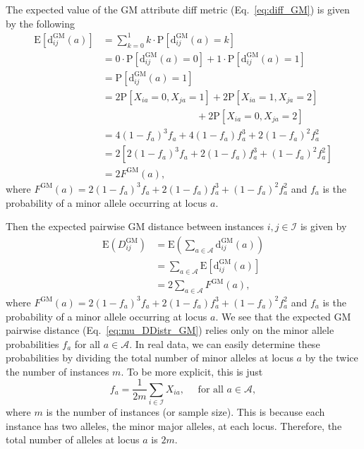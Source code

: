 \documentclass[aoas]{imsart}
\begin{document}
The expected value of the GM attribute diff metric (Eq.~\ref{eq:diff_GM}) is given by the following
%
\begin{equation}\label{eq:mean_diff_GM}
\begin{aligned}
\text{E}\left[\text{d}^\text{GM}_{ij}(a)\right] &= \sum_{k=0}^{1} k \cdot \text{P}\left[\text{d}^\text{GM}_{ij}(a) = k\right] \\
&= 0 \cdot \text{P}\left[\text{d}^\text{GM}_{ij}(a) = 0\right] + 1 \cdot \text{P}\left[\text{d}^\text{GM}_{ij}(a) = 1\right] \\
&= \text{P}\left[\text{d}^\text{GM}_{ij}(a) = 1\right] \\
&= 2\text{P}[X_{ia} = 0, X_{ja} = 1] + 2\text{P}[X_{ia} = 1, X_{ja} = 2] \\
&\hspace{4cm}+ 2\text{P}[X_{ia} = 0, X_{ja} = 2] \\
&= 4(1 - f_a)^3f_a + 4(1 - f_a)f^3_a + 2(1 - f_a)^2f^2_a \\
&= 2\left[2(1 - f_a)^3f_a + 2(1 - f_a)f^3_a + (1 - f_a)^2f^2_a\right] \\
&= 2F^\text{GM}(a),
\end{aligned}
\end{equation}
%
where $F^\text{GM}(a) = 2(1 - f_a)^3f_a + 2(1 - f_a)f^3_a + (1 - f_a)^2f^2_a$ and $f_a$ is the probability of a minor allele occurring at locus $a$.

Then the expected pairwise GM distance between instances $i,j \in \mathcal{I}$ is given by
%
\begin{equation}\label{eq:mu_DDistr_GM}
\begin{aligned}
\text{E}\left(D^\text{GM}_{ij}\right) &= \text{E}\left(\sum_{a \in \mathcal{A}} \text{d}^\text{GM}_{ij}(a)\right) \\
&= \sum_{a \in \mathcal{A}} \text{E}\left[\text{d}^\text{GM}_{ij}(a)\right] \\
&= 2 \sum_{a \in \mathcal{A}} F^\text{GM}(a),
\end{aligned}
\end{equation}
%
where $F^\text{GM}(a) = 2(1 - f_a)^3f_a + 2(1 - f_a)f^3_a + (1 - f_a)^2f^2_a$ and $f_a$ is the probability of a minor allele occurring at locus $a$. We see that the expected GM pairwise distance (Eq.~\ref{eq:mu_DDistr_GM}) relies only on the minor allele probabilities $f_a$ for all $a \in \mathcal{A}$. In real data, we can easily determine these probabilities by dividing the total number of minor alleles at locus $a$ by the twice the number of instances $m$. To be more explicit, this is just
%
\[
f_a = \frac{1}{2m}\sum_{i \in \mathcal{I}} X_{ia},  \quad \text{ for all } a \in \mathcal{A},
\]
%
where $m$ is the number of instances (or sample size). This is because each instance has two alleles, the minor major alleles, at each locus. Therefore, the total number of alleles at locus $a$ is $2m$.
\end{document}
